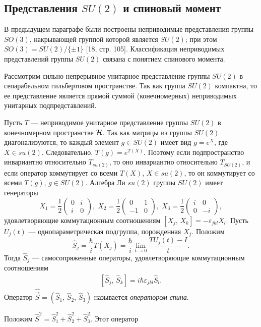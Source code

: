 \documentclass[a4paper
]{article}
\begin{document}
\subsection{Представления $SU(2)$ и спиновый момент}
В предыдущем параграфе были построены неприводимые представления
группы $SO(3)$, накрывающей группой которой является $SU(2)$;
при этом $SO(3)=SU(2)/\{\pm 1\}$ [18, стр. 105]. Классификация неприводимых
представлений группы $SU(2)$ связана с понятием спинового момента. \par
Рассмотрим сильно непрерывное унитарное представление
группы $SU(2)$ в сепарабельном гильбертовом пространстве. Так как группа
$SU(2)$ компактна, то ее представление является прямой суммой
(конечномерных) неприводимых унитарных подпредставлений. \par
Пусть $T$ --- неприводимое унитарное представление группы $SU(2)$
в конечномерном пространстве ${\cal H}$. Так как матрицы из группы
$SU(2)$ диагонализуются, то каждый элемент $g\in SU(2)$ имеет вид
$g=e^{X}$, где $X\in su(2)$. Следовательно, $T(g)=e^{T(X)}$. Поэтому
если подпространство инвариантно относительно $T_{su(2)}$, то оно
инвариантно относительно $T_{SU(2)}$, и если оператор коммутирует со
всеми $T(X)$, $X\in su(2)$, то он коммутирует со всеми $T(g)$,
$g\in SU(2)$. Алгебра Ли $su(2)$ группы $SU(2)$ имеет генераторы
$$X_1=\frac12\begin{pmatrix}0 & i \\ i & 0\end{pmatrix}, \; X_2=
\frac12\begin{pmatrix} 0 & 1 \\ -1 & 0\end{pmatrix}, \; X_3=
\frac12\begin{pmatrix} i & 0 \\ 0 & -i\end{pmatrix},$$ удовлетворяющие
коммутационным соотношениям $[X_j, \, X_k]=-\varepsilon_{jkl}X_l$.
Пусть $U_j(t)$ --- однопараметрическая подгруппа, порожденная $X_j$.
Положим $$\hat S_j=\frac{\hbar}{i}T(X_j)=\frac{\hbar}{i}\lim
\limits_{t\rightarrow 0}\frac{TU_j(t)-I}{t}.$$ Тогда $\hat S_j$ ---
самосопряженные операторы, удовлетворяющие коммутационным соотношениям
\begin{align}
\label{comm_sootn_spin}
[\hat S_j, \, \hat S_k]=i\hbar \varepsilon_{jkl}\hat S_l.
\end{align}
Оператор $\hat{\vec S}=(\hat S_1, \, \hat S_2, \, \hat S_3)$ называется
{\it оператором спина}. \par
Положим $\hat S^2=\hat S_1^2+\hat S_2^2+\hat S_3^2$. Этот оператор
\end{document}
